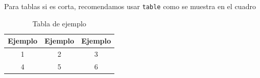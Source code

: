 \documentclass{article}
\begin{document}
Para tablas si es corta, recomendamos usar \texttt{table} como se muestra en el cuadro


\begin{table}[H]
  \centering
  \begin{tabular}{|c|c|c|}
    \hline
    Ejemplo & Ejemplo & Ejemplo \\ \hline
    1 & 2 & 3 \\ \hline
    4 & 5 & 6 \\ \hline
  \end{tabular}
  \caption{Tabla de ejemplo}
  \label{tab:tabla-ejemplo}
\end{table}


\printbibliography

\newpage

\thispagestyle{empty}

\vspace*{0.3\textwidth}

\begin{figure}[H]
  \centering
  
\end{figure}
\end{document}
